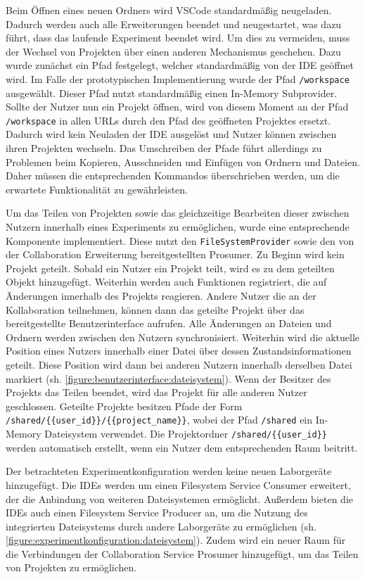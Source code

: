 Beim Öffnen eines neuen Ordners wird VSCode standardmäßig neugeladen. Dadurch werden auch alle Erweiterungen beendet und neugestartet, was dazu führt, dass das laufende Experiment beendet wird. Um dies zu vermeiden, muss der Wechsel von Projekten über einen anderen Mechanismus geschehen. Dazu wurde zunächst ein Pfad festgelegt, welcher standardmäßig von der IDE geöffnet wird. Im Falle der prototypischen Implementierung wurde der Pfad \texttt{/workspace} ausgewählt. Dieser Pfad nutzt standardmäßig einen In-Memory Subprovider. Sollte der Nutzer nun ein Projekt öffnen, wird von diesem Moment an der Pfad \texttt{/workspace} in allen URLs durch den Pfad des geöffneten Projektes ersetzt. Dadurch wird kein Neuladen der IDE ausgelöst und Nutzer können zwischen ihren Projekten wechseln. Das Umschreiben der Pfade führt allerdings zu Problemen beim Kopieren, Ausschneiden und Einfügen von Ordnern und Dateien. Daher müssen die entsprechenden Kommandos überschrieben werden, um die erwartete Funktionalität zu gewährleisten.

Um das Teilen von Projekten sowie das gleichzeitige Bearbeiten dieser zwischen Nutzern innerhalb eines Experiments zu ermöglichen, wurde eine entsprechende Komponente implementiert. Diese nutzt den \texttt{FileSystemProvider} sowie den von der Collaboration Erweiterung bereitgestellten Prosumer. Zu Beginn wird kein Projekt geteilt. Sobald ein Nutzer ein Projekt teilt, wird es zu dem geteilten Objekt hinzugefügt. Weiterhin werden auch Funktionen registriert, die auf Änderungen innerhalb des Projekts reagieren. Andere Nutzer die an der Kollaboration teilnehmen, können dann das geteilte Projekt über das bereitgestellte Benutzerinterface aufrufen. Alle Änderungen an Dateien und Ordnern werden zwischen den Nutzern synchronisiert. Weiterhin wird die aktuelle Position eines Nutzers innerhalb einer Datei über dessen Zustandsinformationen geteilt. Diese Position wird dann bei anderen Nutzern innerhalb derselben Datei markiert (sh. \autoref{figure:benutzerinterface:dateisystem}). Wenn der Besitzer des Projekts das Teilen beendet, wird das Projekt für alle anderen Nutzer geschlossen. Geteilte Projekte besitzen Pfade der Form \texttt{/shared/\{\{user\_id\}\}/\{\{project\_name\}\}}, wobei der Pfad \texttt{/shared} ein In-Memory Dateisystem verwendet. Die Projektordner \texttt{/shared/\{\{user\_id\}\}} werden automatisch erstellt, wenn ein Nutzer dem entsprechenden Raum beitritt.

Der betrachteten Experimentkonfiguration werden keine neuen Laborgeräte hinzugefügt. Die IDEs werden um einen Filesystem Service Consumer erweitert, der die Anbindung von weiteren Dateisystemen ermöglicht. Außerdem bieten die IDEs auch einen Filesystem Service Producer an, um die Nutzung des integrierten Dateisystems durch andere Laborgeräte zu ermöglichen (sh. \autoref{figure:experimentkonfiguration:dateisystem}). Zudem wird ein neuer Raum für die Verbindungen der Collaboration Service Prosumer hinzugefügt, um das Teilen von Projekten zu ermöglichen.